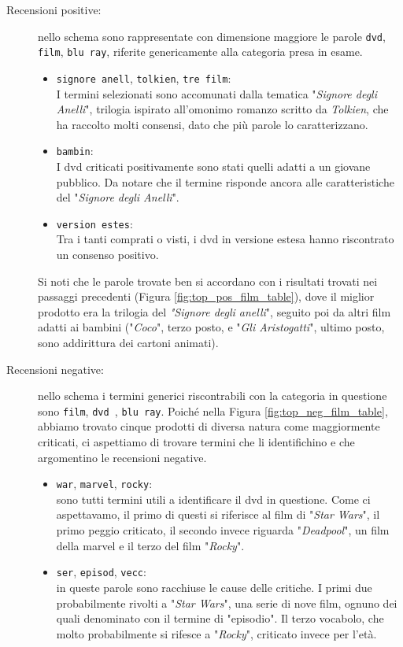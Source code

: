 				\begin{description}
					\item[Recensioni positive:]
					nello schema sono rappresentate con dimensione maggiore le parole \verb|dvd|, \verb|film|, \verb|blu ray|, riferite genericamente alla categoria presa in esame. 	
					\begin{itemize}
						\item \texttt{signore anell}, \texttt{tolkien}, \texttt{tre film}: \\
						I termini selezionati sono accomunati dalla tematica "\textit{Signore degli Anelli}", trilogia ispirato all'omonimo romanzo scritto da \textit{Tolkien}, che ha raccolto molti consensi, dato che più parole lo caratterizzano.
						\item \texttt{bambin}: \\
						I dvd criticati positivamente sono stati quelli adatti a un giovane pubblico. Da notare che il termine risponde ancora alle caratteristiche del "\textit{Signore degli Anelli}".
						\item \texttt{version estes}: \\
						Tra i tanti comprati o visti, i dvd in versione estesa hanno riscontrato un consenso positivo.
					\end{itemize}	
					
					Si noti che le parole trovate ben si accordano con i risultati trovati nei passaggi precedenti (Figura \ref{fig:top_pos_film_table}), dove il miglior prodotto era la trilogia del \textit{"Signore degli anelli}", seguito poi da altri film adatti ai bambini ("\textit{Coco}", terzo posto, e "\textit{Gli Aristogatti}", ultimo posto, sono addirittura dei cartoni animati).
						
					\item[Recensioni negative:] 
					nello schema i termini generici riscontrabili con la categoria in questione sono \verb|film|, \verb|dvd |, \verb|blu ray|. Poiché nella Figura \ref{fig:top_neg_film_table}, abbiamo trovato cinque prodotti di diversa natura come maggiormente criticati, ci aspettiamo di trovare termini che li identifichino e che argomentino le recensioni negative.
					\begin{itemize}
						\item \texttt{war}, \texttt{marvel}, \texttt{rocky}: \\
						sono tutti termini utili a identificare il dvd in questione. Come ci aspettavamo, il primo di questi si riferisce al film di "\textit{Star Wars}", il primo peggio criticato, il secondo invece riguarda "\textit{Deadpool}", un film della marvel e il terzo del film "\textit{Rocky}". 
						\item \texttt{ser}, \texttt{episod}, \texttt{vecc}: \\
						in queste parole sono racchiuse le cause delle critiche. I primi due probabilmente rivolti a "\textit{Star Wars}", una serie di nove film, ognuno dei quali denominato con il termine di "episodio". Il terzo vocabolo, che molto probabilmente si rifesce a "\textit{Rocky}", criticato invece per l'età.		
					\end{itemize}
				\end{description}
			
